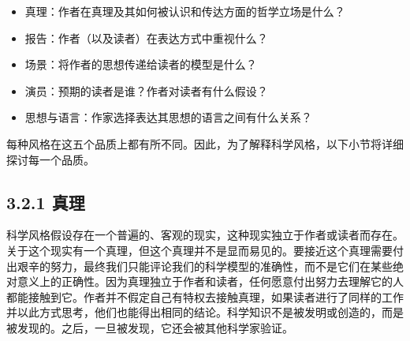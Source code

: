 \begin{itemize}
\item 真理：作者在真理及其如何被认识和传达方面的哲学立场是什么？
\item 报告：作者（以及读者）在表达方式中重视什么？
\item 场景：将作者的思想传递给读者的模型是什么？
\item 演员：预期的读者是谁？作者对读者有什么假设？
\item 思想与语言：作家选择表达其思想的语言之间有什么关系？
\end{itemize}

每种风格在这五个品质上都有所不同。因此，为了解释科学风格，以下小节将详细探讨每一个品质。

\subsection*{3.2.1 真理}
科学风格假设存在一个普遍的、客观的现实，这种现实独立于作者或读者而存在。关于这个现实有一个真理，但这个真理并不是显而易见的。要接近这个真理需要付出艰辛的努力，最终我们只能评论我们的科学模型的准确性，而不是它们在某些绝对意义上的正确性。因为真理独立于作者和读者，任何愿意付出努力去理解它的人都能接触到它。作者并不假定自己有特权去接触真理，如果读者进行了同样的工作并以此方式思考，他们也能得出相同的结论。科学知识不是被发明或创造的，而是被发现的。之后，一旦被发现，它还会被其他科学家验证。

